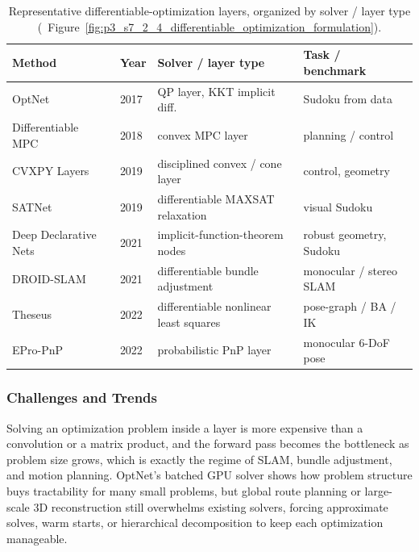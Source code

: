 \begin{table}[t]
    \centering
    \small
    \caption{Representative differentiable-optimization layers, organized by solver / layer type (\cf\ Figure~\ref{fig:p3_s7_2_4_differentiable_optimization_formulation}).}
    \label{tab:p3_s7_2_4_perf}
     \fontsize{9}{11}\selectfont
    \setlength{\tabcolsep}{1.0mm}
    \begin{tabular}{L{0.26\textwidth} L{0.10\textwidth} L{0.28\textwidth} L{0.28\textwidth}}
        \toprule
        \textbf{Method} & \textbf{Year} & \textbf{Solver / layer type} & \textbf{Task / benchmark} \\
        \midrule
        OptNet~\cite{amos2017optnet}                 & 2017 & QP layer, KKT implicit diff.            & Sudoku from data            \\
        Differentiable MPC~\cite{amos2018differentiable} & 2018 & convex MPC layer                    & planning / control          \\
        CVXPY Layers~\cite{agrawal2019differentiable} & 2019 & disciplined convex / cone layer        & control, geometry           \\
        SATNet~\cite{wang2019satnet}                 & 2019 & differentiable MAXSAT relaxation       & visual Sudoku               \\
        Deep Declarative Nets~\cite{gould2021deep}   & 2021 & implicit-function-theorem nodes        & robust geometry, Sudoku     \\
        DROID-SLAM~\cite{teed2021droid}              & 2021 & differentiable bundle adjustment       & monocular / stereo SLAM     \\
        Theseus~\cite{pineda2022theseus}             & 2022 & differentiable nonlinear least squares & pose-graph / BA / IK        \\
        EPro-PnP~\cite{chen2022epro}                 & 2022 & probabilistic PnP layer                & monocular 6-DoF pose        \\
        \bottomrule
    \end{tabular}
\end{table}




\subsubsection{Challenges and Trends}
Solving an optimization problem inside a layer is more expensive than a convolution or a matrix product, and the forward pass becomes the bottleneck as problem size grows, which is exactly the regime of SLAM, bundle adjustment, and motion planning.
OptNet's batched GPU solver shows how problem structure buys tractability for many small problems, but global route planning or large-scale 3D reconstruction still overwhelms existing solvers, forcing approximate solves, warm starts, or hierarchical decomposition to keep each optimization manageable.

